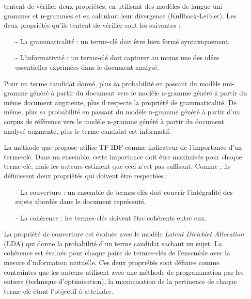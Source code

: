       \citet{tomokiyo2003languagemodel} tentent de vérifier deux propriétés, en
      utilisant des modèles de langue uni-grammes et n-grammes et en calculant
      leur divergence (Kullback-Leibler). Les deux propriétés qu'ils tentent de
      vérifier sont les suivantes :
      \begin{enumerate}
        \item[-]{La grammaticalité : un terme-clé doit être bien formé
                 syntaxiquement.}
        \item[-]{L'informativité : un terme-clé doit capturer au moins une des
                 idées essentielles exprimées dans le document analysé.}
      \end{enumerate}
      Pour un terme candidat donné, plus sa probabilité en passant du modèle
      uni-gramme généré à partir du document vers le modèle n-gramme généré
      à partir du même document augmente, plus il respecte la propriété de
      grammaticalité. De même, plus sa probabilité en passant du modèle
      n-gramme généré à partir d'un corpus de référence vers le modèle
      n-gramme généré à partir du document analysé augmente, plus le terme
      candidat est informatif.

      La méthode que propose \citet{ding2011binaryintegerprogramming} utilise
      TF-IDF comme indicateur de l'importance d'un terme-clé. Dans un ensemble,
      cette importance doit être maximisée pour chaque terme-clé, mais les
      auteurs estiment que ceci n'est pas suffisant. Comme
      \citet{tomokiyo2003languagemodel}, ils définissent deux propriétés qui
      doivent être respectées :
      \begin{enumerate}
        \item[-]{La couverture : un ensemble de termes-clés doit couvrir
                 l'intégralité des sujets abordés dans le document représenté.}
        \item[-]{La cohérence : les termes-clés doivent être cohérents entre
                 eux.}
      \end{enumerate}
      La propriété de couverture est évaluée avec le modèle \textit{Latent
      Dirichlet Allocation} (LDA) qui donne la probabilité d'un terme candidat
      sachant un sujet. La cohérence est évaluée pour chaque paire de
      termes-clés de l'ensemble avec la mesure d'information mutuelle. Ces deux
      propriétés sont définies comme contraintes que les auteurs utilisent avec
      une méthode de programmation par les entiers (technique d'optimisation),
      la maximisation de la pertinence de chaque terme-clé étant l'objectif à
      atteindre.

